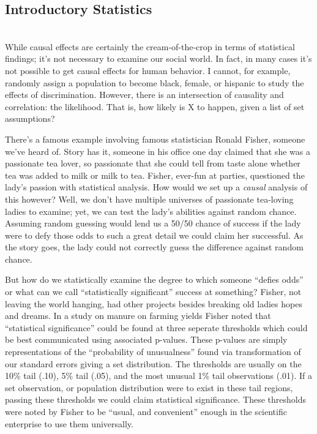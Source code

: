 \documentclass[12pt]{article}\usepackage[]{graphicx}\usepackage[]{color}
\begin{document}
\begin{flushleft}
\clearpage
\section{Introductory Statistics}
\hfill \\

While causal effects are certainly the cream-of-the-crop in terms of statistical findings; it's not necessary to examine our social world. In fact, in many cases it's not possible to get causal effects for human behavior. I cannot, for example, randomly assign a population to become black, female, or hispanic to study the effects of discrimination. However, there is an intersection of causality and correlation: the likelihood. That is, how likely is X to happen, given a list of set assumptions?

There's a famous example involving famous statistician Ronald Fisher, someone we've heard of. Story has it, someone in his office one day claimed that she was a passionate tea lover, so passionate that she could tell from taste alone whether tea was added to milk or milk to tea. Fisher, ever-fun at parties, questioned the lady's passion with statistical analysis. How would we set up a \textit{causal} analysis of this however? Well, we don't have multiple universes of passionate tea-loving ladies to examine; yet, we can test the lady's abilities against random chance. Assuming random guessing would lend us a 50/50 chance of success if the lady were to defy those odds to such a great detail we could claim her successful. As the story goes, the lady could not correctly guess the difference against random chance.

But how do we statistically examine the degree to which someone ``defies odds'' or what can we call ``statistically significant'' success at something? Fisher, not leaving the world hanging, had other projects besides breaking old ladies hopes and dreams. In a study on manure on farming yields Fisher noted that ``statistical significance'' could be found at three seperate thresholds which could be best communicated using associated p-values. These p-values are simply representations of the ``probability of unusualness'' found via transformation of our standard errors giving a set distribution. The thresholds are usually on the 10\% tail (.10), 5\% tail (.05), and the most unusual 1\% tail observations (.01). If a set observation, or population distribution were to exist in these tail regions, passing these thresholds we could claim statistical significance. These thresholds were noted by Fisher to be ``usual, and convenient'' enough in the scientific enterprise to use them universally.


\end{flushleft}
\end{document}
